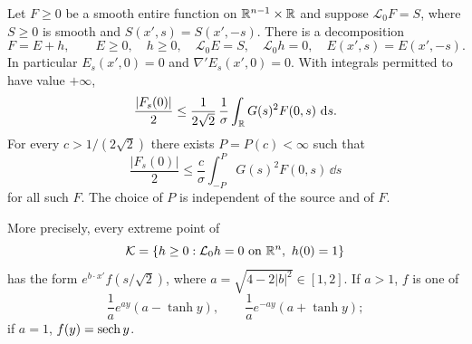 \begin{lemma}\label{lem:diffuse-positive}
Let $F\ge0$ be a smooth entire function on $\mathbb R^{n-1}\times\mathbb R$ and suppose
$\mathcal L_0 F=S$, where $S\ge0$ is smooth and
$S(x',s)=S(x',-s)$. There is a decomposition
\begin{equation}\label{eq:diffuse-Riesz}
 F=E+h,\qquad E\ge0,\quad h\ge0,\quad
 \mathcal L_0 E=S,\quad \mathcal L_0 h=0,
 \quad E(x',s)=E(x',-s).
\end{equation}
In particular $E_s(x',0)=0$ and $\nabla' E_s(x',0)=0$.
With integrals permitted to have value $+\infty$,
\begin{equation}\label{eq:diffuse-sharp-positive}
 \frac{|F_s(0)|}{2}
 \le\frac{1}{2\sqrt2}\,\frac1\sigma
                       \int_\mathbb R G(s)^2F(0,s)\,\,\mathrm d s.
\end{equation}
For every $c>1/(2\sqrt2)$ there exists $P=P(c)<\infty$ such that
\begin{equation}\label{eq:diffuse-positive-window}
 \frac{|F_s(0)|}{2}
 \le\frac{c}{\sigma}\int_{-P}^P G(s)^2F(0,s)\,\dd s
\end{equation}
for all such $F$. The choice of $P$ is independent of the source and of $F$.

More precisely, every extreme point of
\[
 \mathcal K=\{h\ge0:\mathcal L_0 h=0\text{ on }\mathbb R^n,\ h(0)=1\}
\]
has the form $e^{b\cdot x'}f(s/\sqrt2)$, where
$a=\sqrt{4-2|b|^2}\in[1,2]$. If $a>1$, $f$ is one of
\begin{equation}\label{eq:diffuse-extremals}
 \frac1a e^{ay}(a-\tanh y),\qquad
 \frac1a e^{-ay}(a+\tanh y);
\end{equation}
if $a=1$, $f(y)=\operatorname{sech} y$.
\end{lemma}

